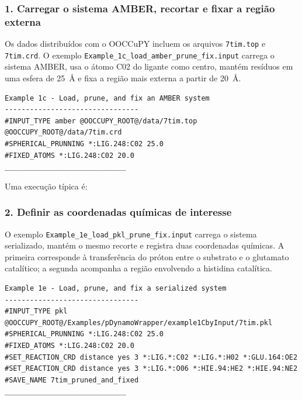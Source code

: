\documentclass[a4paper,11pt]{refart}
\newcommand{\code}[1]{\texttt{#1}}
\newcommand{\angstrom}{\AA}
\begin{document}
\subsubsection{1. Carregar o sistema AMBER, recortar e fixar a região externa}

Os dados distribuídos com o OOCCuPY incluem os arquivos \code{7tim.top} e \code{7tim.crd}. O exemplo \code{Example\_1c\_load\_amber\_prune\_fix.input} carrega o sistema AMBER, usa o átomo C02 do ligante como centro, mantém resíduos em uma esfera de 25~\angstrom{} e fixa a região mais externa a partir de 20~\angstrom{}.

\begin{lstlisting}[caption={OOCCuPY -- carregamento, pruning e fixação da TIM},label={ooccupy_tim_load}]
Example 1c - Load, prune, and fix an AMBER system
--------------------------------
#INPUT_TYPE amber @OOCCUPY_ROOT@/data/7tim.top @OOCCUPY_ROOT@/data/7tim.crd
#SPHERICAL_PRUNNING *:LIG.248:C02 25.0
#FIXED_ATOMS *:LIG.248:C02 20.0
_____________________________
\end{lstlisting}

Uma execução típica é:


\subsubsection{2. Definir as coordenadas químicas de interesse}

O exemplo \code{Example\_1e\_load\_pkl\_prune\_fix.input} carrega o sistema serializado, mantém o mesmo recorte e registra duas coordenadas químicas. A primeira corresponde à transferência do próton entre o substrato e o glutamato catalítico; a segunda acompanha a região envolvendo a histidina catalítica.

\begin{lstlisting}[caption={OOCCuPY -- definição das coordenadas químicas da TIM},label={ooccupy_tim_rcs}]
Example 1e - Load, prune, and fix a serialized system
--------------------------------
#INPUT_TYPE pkl @OOCCUPY_ROOT@/Examples/pDynamoWrapper/example1CbyInput/7tim.pkl
#SPHERICAL_PRUNNING *:LIG.248:C02 25.0
#FIXED_ATOMS *:LIG.248:C02 20.0
#SET_REACTION_CRD distance yes 3 *:LIG.*:C02 *:LIG.*:H02 *:GLU.164:OE2
#SET_REACTION_CRD distance yes 3 *:LIG.*:O06 *:HIE.94:HE2 *:HIE.94:NE2
#SAVE_NAME 7tim_pruned_and_fixed
_____________________________
\end{lstlisting}
\end{document}
